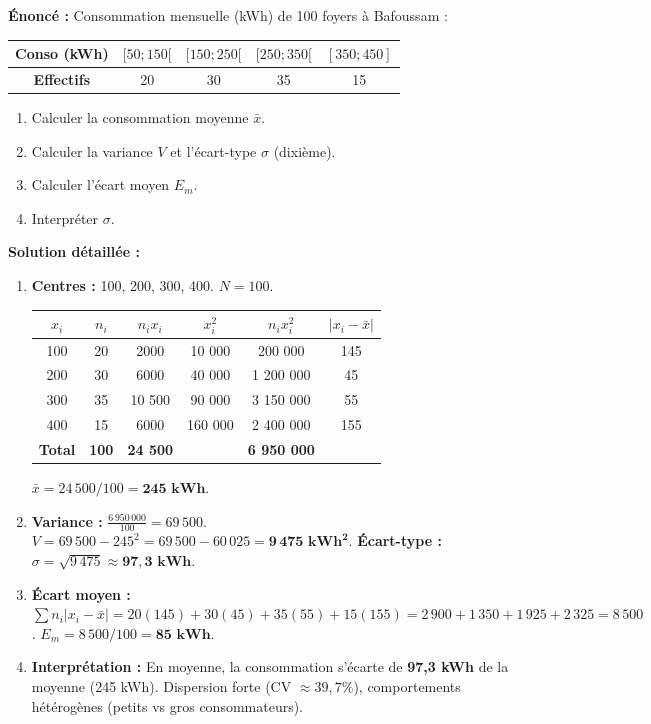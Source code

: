 \documentclass[11pt]{article}
\begin{document}
\begin{exoresolu}
\textbf{Énoncé :} Consommation mensuelle (kWh) de 100 foyers à Bafoussam :
\begin{center}
\begin{tabular}{|c|c|c|c|c|}\hline
\textbf{Conso (kWh)} & $[50; 150[$ & $[150; 250[$ & $[250; 350[$ & $[350; 450]$ \\ \hline
\textbf{Effectifs} & 20 & 30 & 35 & 15 \\ \hline
\end{tabular}
\end{center}
\begin{enumerate}
    \item Calculer la consommation moyenne $\bar{x}$.
    \item Calculer la variance $V$ et l'écart-type $\sigma$ (dixième).
    \item Calculer l'écart moyen $E_m$.
    \item Interpréter $\sigma$.
\end{enumerate}
\tcblower
\textbf{Solution détaillée :}
\begin{enumerate}
    \item \textbf{Centres :} 100, 200, 300, 400. $N=100$.
    \begin{center}
    \begin{tabular}{|c|c|c|c|c|c|}\hline
    $x_i$ & $n_i$ & $n_i x_i$ & $x_i^2$ & $n_i x_i^2$ & $|x_i - \bar{x}|$ \\ \hline
    100 & 20 & 2000 & 10 000 & 200 000 & 145 \\ \hline
    200 & 30 & 6000 & 40 000 & 1 200 000 & 45 \\ \hline
    300 & 35 & 10 500 & 90 000 & 3 150 000 & 55 \\ \hline
    400 & 15 & 6000 & 160 000 & 2 400 000 & 155 \\ \hline
    \textbf{Total} & \textbf{100} & \textbf{24 500} & & \textbf{6 950 000} & \\ \hline
    \end{tabular}
    \end{center}
    $\bar{x} = 24\,500 / 100 = \mathbf{245 \text{ kWh}}$.
    \item \textbf{Variance :} $\frac{6\,950\,000}{100} = 69\,500$. $V = 69\,500 - 245^2 = 69\,500 - 60\,025 = \mathbf{9\,475 \text{ kWh}^2}$.
    \textbf{Écart-type :} $\sigma = \sqrt{9\,475} \approx \mathbf{97,3 \text{ kWh}}$.
    \item \textbf{Écart moyen :} $\sum n_i |x_i - \bar{x}| = 20(145)+30(45)+35(55)+15(155) = 2\,900+1\,350+1\,925+2\,325 = 8\,500$.
    $E_m = 8\,500 / 100 = \mathbf{85 \text{ kWh}}$.
    \item \textbf{Interprétation :} En moyenne, la consommation s'écarte de \textbf{97,3 kWh} de la moyenne (245 kWh). Dispersion forte (CV $\approx 39,7\%$), comportements hétérogènes (petits vs gros consommateurs).
\end{enumerate}
\end{exoresolu}
\end{document}
